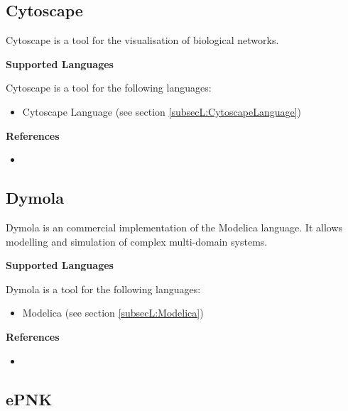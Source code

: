 \subsection{Cytoscape}
\label{subsecT:Cytoscape}


Cytoscape is a tool for the visualisation of biological networks.

\textbf{Supported Languages}

Cytoscape is a tool for the following languages:
\begin{itemize}
	\item Cytoscape Language (see section \ref{subsecL:CytoscapeLanguage})
\end{itemize}


\textbf{References}
\begin{itemize}
	
\item {}
\end{itemize}



\subsection{Dymola}
\label{subsecT:Dymola}


Dymola is an commercial implementation of the Modelica language. It allows modelling and simulation of complex multi-domain systems.

\textbf{Supported Languages}

Dymola is a tool for the following languages:
\begin{itemize}
	\item Modelica (see section \ref{subsecL:Modelica})
\end{itemize}


\textbf{References}
\begin{itemize}
	
\item {}
\end{itemize}



\subsection{ePNK}
\label{subsecT:ePNK}


